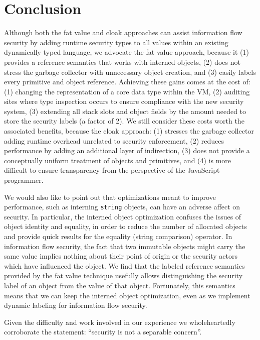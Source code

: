\documentclass[11pt,onecolumn]{article}
\begin{document}
\section{Conclusion}\label{sec:conclusion}

Although both the fat value and cloak approaches can assist information flow security by adding runtime security types to all values within an existing dynamically typed language, we advocate the fat value approach, because it
(1) provides a reference semantics that works with interned objects,
(2) does not stress the garbage collector with unnecessary object creation,
and (3) easily labels every primitive and object reference.
Achieving these gains comes at the cost of:
(1) changing the representation of a core data type within the VM,
(2) auditing sites where type inspection occurs to ensure compliance with the new security system,
(3) extending all stack slots and object fields by the amount needed to store the security labels (a factor of 2).
We still consider these costs worth the associated benefits, because the cloak approach:
(1) stresses the garbage collector adding runtime overhead unrelated to security enforcement,
(2) reduces performance by adding an additional layer of indirection,
(3) does not provide a conceptually uniform treatment of objects and primitives,
and (4) is more difficult to ensure transparency from the perspective of the JavaScript programmer.

We would also like to point out that optimizations meant to improve performance, such as interning \texttt{string} objects, can have an adverse affect on security.
In particular, the interned object optimization confuses the issues of object identity and equality, in order to reduce the number of allocated objects and provide quick results for the equality (string comparison) operator.
In information flow security, the fact that two immutable objects might carry the same value implies nothing about their point of origin or the security actors which have influenced the object.
We find that the labeled reference semantics provided by the fat value technique usefully allows distinguishing the security label of an object from the value of that object.
Fortunately, this semantics means that we can keep the interned object optimization, even as we implement dynamic labeling for information flow security.

Given the difficulty and work involved in our experience we wholeheartedly corroborate the statement: ``security is not a separable concern''\cite{miller2005structure}.
\end{document}

